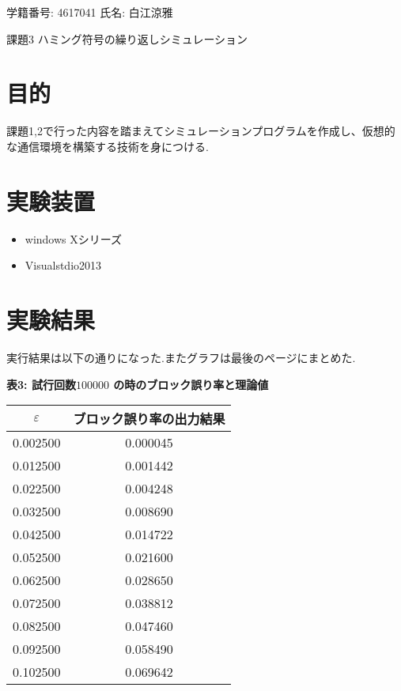 \documentclass[12pt]{jarticle}
\begin{document}
\begin{center}
  学籍番号: 4617041 氏名: 白江涼雅
\end{center}

{\LARGE 課題3 ハミング符号の繰り返しシミュレーション}

\section{目的}
課題1,2で行った内容を踏まえてシミュレーションプログラムを作成し、仮想的な通信環境を構築する技術を身につける.

\section{実験装置}
\begin{itemize}
 \item windows Xシリーズ
 \item Visualstdio2013
\end{itemize}

\section{実験結果}
実行結果は以下の通りになった.またグラフは最後のページにまとめた.
\begin{center}
  \textbf{表3: 試行回数$100000$ の時のブロック誤り率と理論値}
    \begin{tabular}{|c|c|} \hline
      $\varepsilon$ & ブロック誤り率の出力結果\\ \hline
      0.002500 & 0.000045 \\ \hline
      0.012500 & 0.001442 \\ \hline
      0.022500 & 0.004248 \\ \hline
      0.032500 & 0.008690 \\ \hline
      0.042500 & 0.014722 \\ \hline
      0.052500 & 0.021600 \\ \hline
      0.062500 & 0.028650 \\ \hline
      0.072500 & 0.038812 \\ \hline
      0.082500 & 0.047460 \\ \hline
      0.092500 & 0.058490 \\ \hline
      0.102500 & 0.069642 \\ \hline
    \end{tabular}
\end{center}

      
\end{document}
